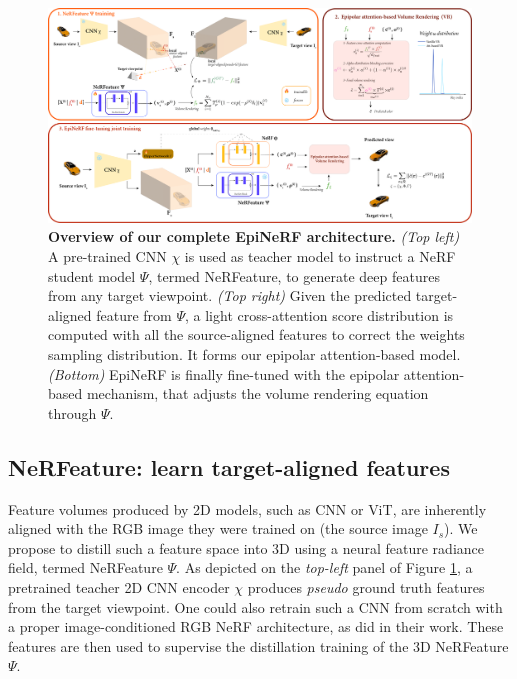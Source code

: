 \begin{figure}[htb!]
    \begin{center}
  \includegraphics[width=\linewidth]{images/epinerf/overview_architecture_NEW.png}
  \end{center}
  \caption{\textbf{Overview of our complete EpiNeRF architecture.} \textit{(Top left)} A pre-trained \ac{CNN} $\chi$ is used as teacher model to instruct a NeRF student model $\Psi$, termed NeRFeature, to generate deep features from any target viewpoint. \textit{(Top right)} Given the predicted target-aligned feature from $\Psi$, a light cross-attention score distribution is computed with all the source-aligned features to correct the weights sampling distribution. It forms our epipolar attention-based model. \textit{(Bottom)} EpiNeRF is finally fine-tuned with the epipolar attention-based mechanism, that adjusts the volume rendering equation through $\Psi$.}
  \label{fig:overview}
\end{figure}

\subsection{NeRFeature: learn target-aligned features}
\label{subsec:nerfeature}

Feature volumes produced by 2D models, such as \ac{CNN} or \ac{ViT}, are inherently aligned with the RGB image they were trained on (\ie the source image $I_s$). We propose to distill such a feature space into 3D using a neural feature radiance field, termed NeRFeature $\Psi$. As depicted on the \textit{top-left} panel of Figure \ref{fig:overview}, a pretrained teacher 2D \ac{CNN} encoder $\chi$ produces \textit{pseudo} ground truth features from the target viewpoint. One could also retrain such a \ac{CNN} from scratch with a proper image-conditioned RGB \ac{NeRF} architecture, as \citep{yu2021pixelnerf,li2022symmnerf,lin2023vision,jang2021codenerf} did in their work. These features are then used to supervise the distillation training of the 3D NeRFeature $\Psi$. \newline

